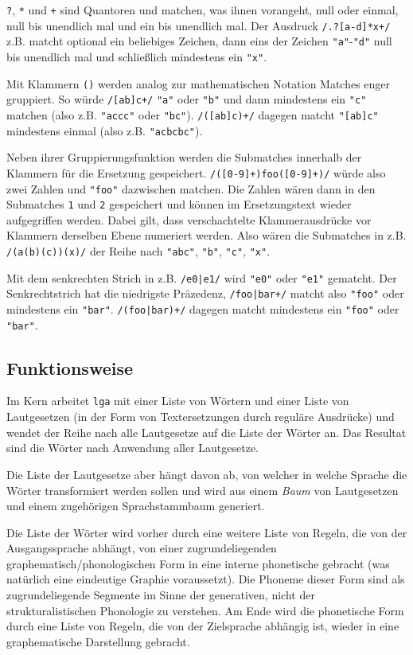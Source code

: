 \documentclass[12pt,a4paper,normalheadings,bibliography=totoc]{scrartcl}
\def\tt#1{\texttt{#1}}
\def\rx#1{\texttt{/#1/}}
\def\str#1{\texttt{"#1"}}
\begin{document}
\tt{?}, \tt{*} und \tt{+} sind Quantoren
und matchen, was ihnen vorangeht, null oder einmal, null bis unendlich mal
und ein bis unendlich mal.
Der Ausdruck \rx{.?[a-d]*x+} z.B.
matcht optional ein beliebiges Zeichen, dann eins der Zeichen \str{a}-\str{d}
null bis unendlich mal und schließlich mindestens ein \str{x}.

Mit Klammern \tt{()} werden analog zur mathematischen Notation
Matches enger gruppiert.
So würde \rx{[ab]c+} \str{a} oder \str{b} und dann mindestens ein
\str{c} matchen (also z.B. \str{accc} oder \str{bc}).
\rx{([ab]c)+} dagegen matcht \str{[ab]c} mindestens einmal
(also z.B. \str{acbcbc}).

Neben ihrer Gruppierungsfunktion werden die Submatches innerhalb
der Klammern für die Ersetzung gespeichert.
\rx{([0-9]+)foo([0-9]+)} würde also zwei Zahlen und \str{foo} dazwischen
matchen.
Die Zahlen wären dann in den Submatches \tt{1} und \tt{2} gespeichert
und können im Ersetzungstext wieder aufgegriffen werden.
Dabei gilt, dass verschachtelte Klammerausdrücke vor Klammern derselben
Ebene numeriert werden. Also wären die Submatches in z.B. \rx{(a(b)(c))(x)}
der Reihe nach \str{abc}, \str{b}, \str{c}, \str{x}.

Mit dem senkrechten Strich in z.B. \rx{e0|e1} wird \str{e0}
oder \str{e1} gematcht.
Der Senkrechtstrich hat die niedrigste Präzedenz,
\rx{foo|bar+} matcht also \str{foo} oder mindestens ein \str{bar}.
\rx{(foo|bar)+} dagegen matcht mindestens ein \str{foo} oder \str{bar}.

\subsection{Funktionsweise}

Im Kern arbeitet \tt{lga} mit einer Liste von Wörtern
und einer Liste von Lautgesetzen
(in der Form von Textersetzungen durch reguläre Ausdrücke)
und wendet der Reihe nach alle Lautgesetze auf die Liste der Wörter an.
Das Resultat sind die Wörter nach Anwendung aller Lautgesetze.

Die Liste der Lautgesetze aber hängt davon ab,
von welcher in welche Sprache die Wörter transformiert werden sollen
und wird aus einem \emph{Baum} von Lautgesetzen und einem
zugehörigen Sprachstammbaum generiert.

Die Liste der Wörter wird vorher durch eine weitere Liste von Regeln,
die von der Ausgangssprache abhängt,
von einer zugrundeliegenden
graphematisch/phono\-logischen
Form in eine interne phonetische gebracht
(was natürlich eine eindeutige Graphie voraussetzt).
Die Phoneme dieser Form sind als zugrundeliegende Segmente im
Sinne der generativen, nicht der strukturalistischen Phonologie zu verstehen.
Am Ende wird die phonetische Form durch eine Liste von Regeln,
die von der Zielsprache abhängig ist,
wieder in eine graphematische Darstellung gebracht.
\end{document}
